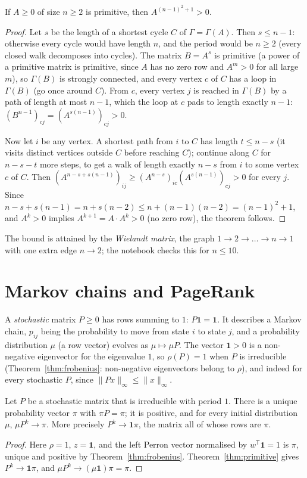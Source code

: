 \begin{theorem}[Wielandt]\label{thm:wielandt}
If $A\ge0$ of size $n\ge2$ is primitive, then $A^{(n-1)^2+1}>0$.
\end{theorem}
\begin{proof}
Let $s$ be the length of a shortest cycle $C$ of $\Gamma=\Gamma(A)$. Then $s\le n-1$: otherwise every cycle would have length $n$,
and the period would be $n\ge2$ (every closed walk decomposes into cycles). The matrix $B=A^s$ is primitive (a power of a
primitive matrix is primitive, since $A$ has no zero row and $A^m>0$ for all large $m$), so $\Gamma(B)$ is strongly connected, and
every vertex $c$ of $C$ has a loop in $\Gamma(B)$ (go once around $C$). From $c$, every vertex $j$ is reached in $\Gamma(B)$ by a
path of length at most $n-1$, which the loop at $c$ pads to length exactly $n-1$: $(B^{n-1})_{cj}=(A^{s(n-1)})_{cj}>0$.

Now let $i$ be any vertex. A shortest path from $i$ to $C$ has length $t\le n-s$ (it visits distinct vertices outside $C$
before reaching $C$); continue along $C$ for $n-s-t$ more steps, to get a walk of length exactly $n-s$ from $i$ to some vertex
$c$ of $C$. Then $(A^{n-s+s(n-1)})_{ij}\ge(A^{n-s})_{ic}(A^{s(n-1)})_{cj}>0$ for every $j$. Since $n-s+s(n-1)=n+s(n-2)\le
n+(n-1)(n-2)=(n-1)^2+1$, and $A^{k}>0$ implies $A^{k+1}=A\cdot A^k>0$ (no zero row), the theorem follows.
\end{proof}

The bound is attained by the \emph{Wielandt matrix}, the graph $1\to2\to\dots\to n\to1$ with one extra edge $n\to2$; the notebook
checks this for $n\le10$.

\section{Markov chains and PageRank}

A \emph{stochastic} matrix $P\ge0$ has rows summing to $1$: $P\mathbf 1=\mathbf 1$. It describes a Markov chain, $p_{ij}$ being the
probability to move from state $i$ to state $j$, and a probability distribution $\mu$ (a row vector) evolves as $\mu\mapsto\mu
P$. The vector $\mathbf 1>0$ is a non-negative eigenvector for the eigenvalue $1$, so $\rho(P)=1$ when $P$ is irreducible
(Theorem~\ref{thm:frobenius}: non-negative eigenvectors belong to $\rho$), and indeed for every stochastic $P$, since $\|Px\|_\infty
\le\|x\|_\infty$.

\begin{corollary}\label{cor:markov}
Let $P$ be a stochastic matrix that is irreducible with period $1$. There is a unique probability vector $\pi$ with $\pi P=\pi$;
it is positive, and for every initial distribution $\mu$, $\mu P^k\to\pi$. More precisely $P^k\to\mathbf 1\pi$, the matrix all of
whose rows are $\pi$.
\end{corollary}
\begin{proof}
Here $\rho=1$, $z=\mathbf 1$, and the left Perron vector normalised by $w^{\mathsf T}\mathbf 1=1$ is $\pi$, unique and positive by
Theorem~\ref{thm:frobenius}. Theorem~\ref{thm:primitive} gives $P^k\to\mathbf 1\pi$, and $\mu P^k\to(\mu\mathbf 1)\pi=\pi$.
\end{proof}

